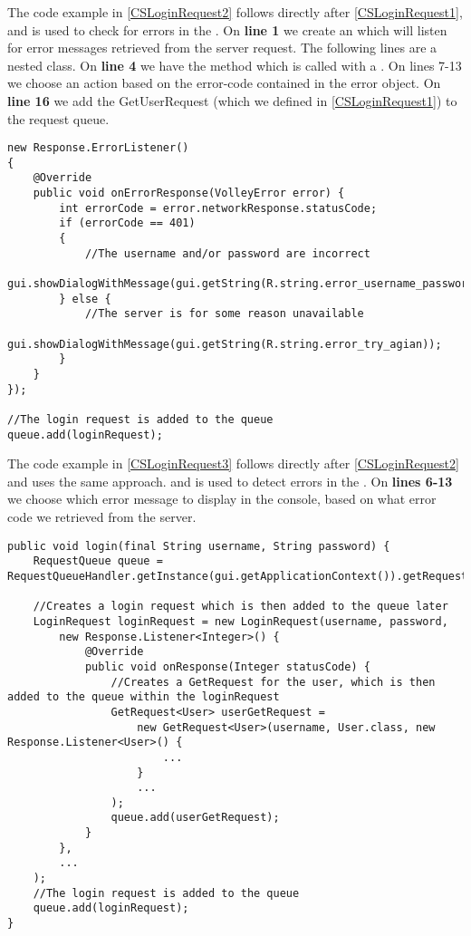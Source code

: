 The code example in \autoref{CSLoginRequest2} follows directly after
\autoref{CSLoginRequest1}, and is used to check for errors in the
. On \textbf{line 1} we create an 
which will listen for error messages retrieved from the server request. The
following lines are a nested class. On \textbf{line 4} we have the
 method which is called with a . On
lines {7-13} we choose an action based on the error-code contained in the error
object. On \textbf{line 16} we add the GetUserRequest (which we defined in
\autoref{CSLoginRequest1}) to the request queue.\nl

\begin{minipage}[H]{\linewidth}
\begin{lstlisting}[caption = Using an errorListener to detect mishaps in the LoginRequest, label = CSLoginRequest3] 
new Response.ErrorListener() 
{
	@Override
    public void onErrorResponse(VolleyError error) {
        int errorCode = error.networkResponse.statusCode;
        if (errorCode == 401) 
        {
        	//The username and/or password are incorrect
            gui.showDialogWithMessage(gui.getString(R.string.error_username_password));
        } else {
            //The server is for some reason unavailable
            gui.showDialogWithMessage(gui.getString(R.string.error_try_agian));
        }
    }
});

//The login request is added to the queue
queue.add(loginRequest);
\end{lstlisting}
\end{minipage}

The code example in \autoref{CSLoginRequest3} follows directly after
\autoref{CSLoginRequest2} and uses the same approach. and is used to detect
errors in the . On \textbf{lines 6-13} we choose which error
message to display in the console, based on what error code we retrieved from
the server.

\begin{minipage}[H]{\linewidth}
\begin{lstlisting}[caption = Using a RequestQueue to commicate with the server,
label = RequestQueue]
public void login(final String username, String password) {
    RequestQueue queue = RequestQueueHandler.getInstance(gui.getApplicationContext()).getRequestQueue();

    //Creates a login request which is then added to the queue later
    LoginRequest loginRequest = new LoginRequest(username, password,
        new Response.Listener<Integer>() {
            @Override
            public void onResponse(Integer statusCode) {
                //Creates a GetRequest for the user, which is then added to the queue within the loginRequest
                GetRequest<User> userGetRequest =
                    new GetRequest<User>(username, User.class, new Response.Listener<User>() {
                       	...
                    }
                    ...
                );
                queue.add(userGetRequest);
            }
        },
		...
    );
    //The login request is added to the queue
    queue.add(loginRequest);
}
\end{lstlisting}
\end{minipage}

